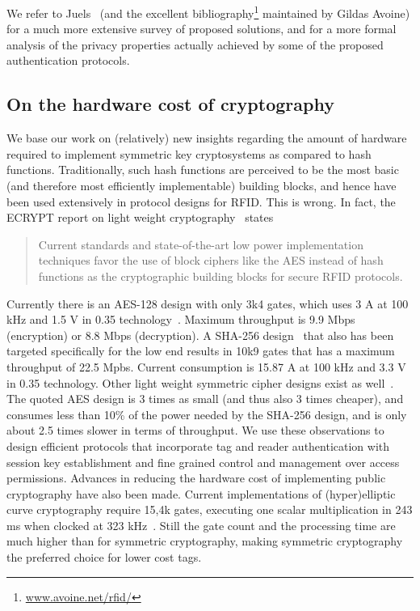 We refer to Juels~\cite{juels2006rfid-secpriv-survey} 
(and the excellent bibliography\footnote{\url{www.avoine.net/rfid/}}
maintained by Gildas Avoine)
for a much more extensive survey of proposed solutions,
and \cite{juels2007strong-privacy-rfid} for a more formal analysis of the
privacy properties actually achieved by some of the proposed
authentication protocols.

\subsection{On the hardware cost of cryptography}

We base our work on (relatively) new insights regarding the amount of hardware
required to implement symmetric key cryptosystems as compared to hash
functions. Traditionally, such hash functions are perceived to be the most
basic (and therefore most efficiently implementable) building blocks, and hence
have been used extensively in protocol designs for RFID. 
This is wrong.
In fact, the ECRYPT report on light weight
cryptography~\cite{oswald2006light-weight-crypto}
states
\begin{quote}
Current standards and state-of-the-art low power implementation techniques
favor the use of block ciphers like the AES instead of hash functions as the
cryptographic building blocks for secure RFID
protocols.
\end{quote}
Currently there is an AES-128 design with only 3k4 gates, 
which uses 3 A at 100 kHz and 1.5 V in 0.35 technology~\cite{feldhofer2005aes-grain-sand,poschmann2007rfid-crypto,feldhofer2007strong-crypto-rfid}. 
Maximum throughput is 9.9 Mbps (encryption) or 8.8 Mbps (decryption). 
A SHA-256 design~\cite{DBLP:conf/otm/FeldhoferR06,feldhofer2007strong-crypto-rfid}
that also has been targeted specifically for the low end 
results in 10k9 gates that has a maximum throughput of 22.5 Mpbs. 
Current consumption is 15.87 A at 100 kHz and 3.3 V in
0.35 technology. Other light weight symmetric cipher designs exist as
well~\cite{bogdanov-present}. 
The quoted AES design is 3 times as small (and thus also 3 times cheaper), 
and consumes less than 10\% of the power needed by the SHA-256 design, 
and is only about 2.5 times slower in terms of throughput.
We use these observations to design efficient protocols that incorporate
tag and reader authentication with session key establishment and 
fine grained control and management over access permissions.
Advances in reducing the hardware cost of implementing public cryptography have
also been made. Current implementations of (hyper)elliptic curve cryptography 
require 15,4k gates, executing one scalar multiplication in 243 ms when clocked
at 323 kHz~\cite{Fan2009HECC,DBLP:journals/tc/LeeSBV08}. Still the gate count
and the processing time are much higher than for symmetric cryptography, making
symmetric cryptography the preferred choice for lower cost tags.

